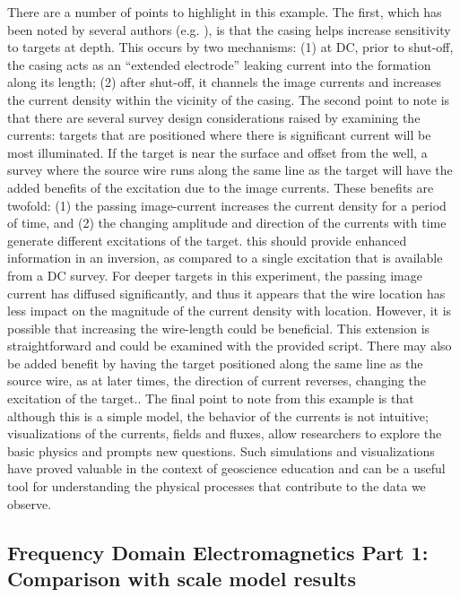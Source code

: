 There are a number of points to highlight in this example. The first, which has been noted by several authors (e.g. \cite{Schenkel1994, Hoversten2015}), is that the casing helps increase sensitivity to targets at depth. This occurs by two mechanisms: (1) at DC, prior to shut-off, the casing acts as an ``extended electrode'' leaking current into the formation along its length; (2) after shut-off, it channels the image currents and increases the current density within the vicinity of the casing. The second point to note is that there are several survey design considerations raised by examining the currents: targets that are positioned where there is significant current will be most illuminated. If the target is near the surface and offset from the well, a survey where the source wire runs along the same line as the target will have the added benefits of the excitation due to the image currents. These benefits are twofold: (1) the passing image-current increases the current density for a period of time, and (2) the changing amplitude and direction of the currents with time generate different excitations of the target. this should provide enhanced information in an inversion, as compared to a single excitation that is available from a DC survey. For deeper targets in this experiment, the passing image current has diffused significantly, and thus it appears that the wire location has less impact on the magnitude of the current density with location. However, it is possible that increasing the wire-length could be beneficial. This extension is straightforward and could be examined with the provided script. There may also be added benefit by having the target positioned along the same line as the source wire, as at later times, the direction of current reverses, changing the excitation of the target.. The final point to note from this example is that although this is a simple model, the behavior of the currents is not intuitive; visualizations of the currents, fields and fluxes, allow researchers to explore the basic physics and prompts new questions. Such simulations and visualizations have proved valuable in the context of geoscience education \citep{Oldenburg2017} and can be a useful tool for understanding the physical processes that contribute to the data we observe.



\subsection{Frequency Domain Electromagnetics Part 1: Comparison with scale model results}
\label{sec:FDEM_part1}

